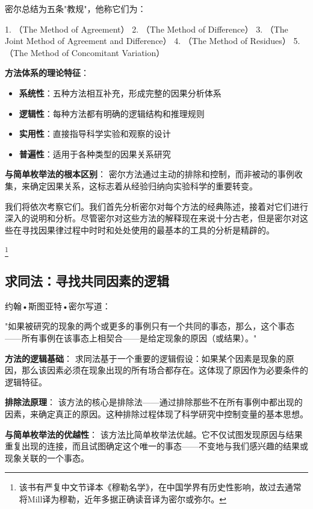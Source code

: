 \begin{theorembox}[title=密尔的五种归纳法则及其理论基础]
密尔总结为五条"教规"，他称它们为：

1. （The Method of Agreement）
2. （The Method of Difference）
3. （The Joint Method of Agreement and Difference）
4. （The Method of Residues）
5. （The Method of Concomitant Variation）

\textbf{方法体系的理论特征}：
\begin{itemize}
\item \textbf{系统性}：五种方法相互补充，形成完整的因果分析体系
\item \textbf{逻辑性}：每种方法都有明确的逻辑结构和推理规则
\item \textbf{实用性}：直接指导科学实验和观察的设计
\item \textbf{普遍性}：适用于各种类型的因果关系研究
\end{itemize}

\textbf{与简单枚举法的根本区别}：
密尔方法通过主动的排除和控制，而非被动的事例收集，来确定因果关系，这标志着从经验归纳向实验科学的重要转变。
\end{theorembox}

我们将依次考察它们。我们首先分析密尔对每个方法的经典陈述，接着对它们进行深入的说明和分析。尽管密尔对这些方法的解释现在来说十分古老，但是密尔对这些在寻找因果律过程中时时和处处使用的最基本的工具的分析是精辟的。

\footnote{该书有严复中文节译本《穆勒名学》，在中国学界有历史性影响，故过去通常将Mill译为穆勒，近年多据正确读音译为密尔或弥尔。}

\subsection{求同法：寻找共同因素的逻辑}

\begin{theorembox}[title=求同法的基本原理]
约翰•斯图亚特•密尔写道：

"如果被研究的现象的两个或更多的事例只有一个共同的事态，那么，这个事态——所有事例在该事态上相契合——是给定现象的原因（或结果）。"

\textbf{方法的逻辑基础}：
求同法基于一个重要的逻辑假设：如果某个因素是现象的原因，那么该因素必须在现象出现的所有场合都存在。这体现了原因作为必要条件的逻辑特征。

\textbf{排除法原理}：
该方法的核心是排除法——通过排除那些不在所有事例中都出现的因素，来确定真正的原因。这种排除过程体现了科学研究中控制变量的基本思想。

\textbf{与简单枚举法的优越性}：
该方法比简单枚举法优越。它不仅试图发现原因与结果重复出现的连接，而且试图确定这个唯一的事态——不变地与我们感兴趣的结果或现象关联的一个事态。
\end{theorembox}

